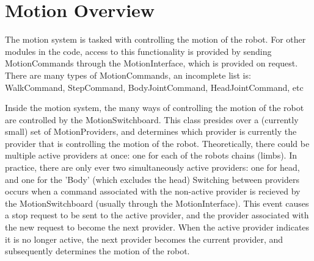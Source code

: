 \documentclass[11pt]{article}
\begin{document}
\begin{abstract}
This README describes the architectural implementation of the motion engine for
the Northern Bites robot soccer team. This document's purpose is to show where
in the code you should look for the code that fulfills a particular function,
or which file might have instructions to lead you closer to that answer.

For information regarding the conceptual meaning of the algorithms and
architecture implemented here, I suggest you look at the following documents:
\begin{enumerate}
\item Dynamically Balanced Omnidirectional Humanoid Locomotion, by Johannes Strom
   Honors Thesis for the Bowdoin College Department of Computer Science, 2009
\item  An Implementation of an Omnidirectional Walk Engine on a Nao Robot, by
   Johannes Strom, George Slavov and Eric Chown in RoboCup 2009, 2009
\item Northern Bites Team Report for the Standard Platform League, 2009 (to appear)
\end{enumerate}

This PDF can be found at \url{http://robocup.bowdoin.edu/public/docs/motion/README.pdf}.
This version of the PDF was generated on \today.
\end{abstract}

\tableofcontents

\section{Motion Overview}
The motion system is tasked with controlling the motion of the robot. For other
modules in the code, access to this functionality is provided by sending
MotionCommands through the MotionInterface, which is provided on request.
There are many types of MotionCommands, an incomplete list is:
   WalkCommand, StepCommand, BodyJointCommand, HeadJointCommand, etc

Inside the motion system, the many ways of controlling the motion of the robot
are controlled by the MotionSwitchboard. This class presides over a (currently
small) set of MotionProviders, and determines which provider is currently the
provider that is controlling the motion of the robot.  Theoretically, there
could be multiple active providers at once: one for each of the robots chains
(limbs). In practice, there are only ever two simultaneously active providers:
one for head, and one for the 'Body' (which excludes the head)
Switching between providers occurs when a command associated with the non-active
provider is recieved by the MotionSwitchboard (usually through the
MotionInterface). This event causes a stop request to be sent to the active
provider, and the provider associated with the new request to become the
next provider.  When the active provider indicates it is no longer active,
the next provider becomes the current provider, and subsequently determines
the motion of the robot.
\end{document}
